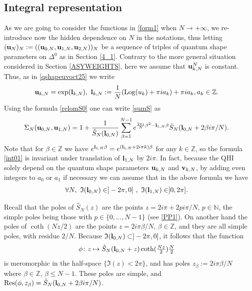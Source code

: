 \documentclass[11pt]{amsart}
\newcommand{\mz}{\mathbb{Z}}
\newcommand{\mn}{\mathbb{N}}
\newcommand{\bu}{{\bf u}}
\newcommand{\bv}{{\bf v}}
\newcommand{\bl}{{\bf l}}
\newcommand{\Log}{{\rm Log}}
\begin{document}
{\subsection{Integral representation} \label{INTREPEST} As we are going to consider the functions in \eqref{form1} when $N\rightarrow +\infty$, we re-introduce now the hidden dependence on $N$ in the notations, thus letting $(\bu_N)_N:=((\bu_{0,N},\bu_{1,N},\bu_{2,N}))_N$ be a sequence of triples of quantum shape parameters on $\Delta^0$ as in Section \ref{4_1}. Contrary to the more general situation considered in Section \ref{ASYWEIGHTS}, here we assume that $\bu_{k,N}^N$ is constant. Thus, as in \eqref{qshapeuvoct25} we write \begin{equation}\label{recapuvarmars25} \bu_{k,N} = \exp(\bl_{k,N}),\ \bl_{k,N}:= \frac{1}{N}(\Log(u_{k}) +\pi ia_{k}) + \pi i a_k, a_{k}\in \mz.\end{equation}
Using the formula \eqref{relomS0} one can write \eqref{sumS} as
\begin{equation}
\Sigma_N(\bu_{0,N},\bu_{1,N}) = 1 + \frac{1}{\hat S_N(\bl_{0,N})}\sum_{\beta=1}^{N-1} e^{\frac{2\pi i}{N} \beta^2 -\bl_{1,N}\beta} \textstyle \hat S_N(\bl_{0,N}+2\beta i\pi/N).\label{int01}
\end{equation}
Note that for $\beta\in \mz$ we have $e^{\bl_{1,N}\beta} = e^{(\bl_{1,N}+2i\pi k)\beta}$ for any $k \in \mz$, so the formula \eqref{int01} is invariant under translation of $\bl_{1,N}$ by $2i\pi$. In fact, because the QHI solely depend on the quantum shape parameters $\bu_{k,N}$ and $\bv_{k,N}$, by adding even integers to $a_0$ or $a_1$ if necessary we can assume that in the above formula we have
\begin{equation}\label{situation2}
\forall N,\ \mathfrak{I}(\bl_{0,N})\in ]-2\pi,0]\ ,\ \mathfrak{I}(\bl_{1,N})\in ]0,2\pi].
\end{equation}

Recall that the poles of $\hat S_N(z)$ are the points $z=2i\pi+2pi\pi/N$, $p\in \mn$, the simple poles being those with $p\in \{0,\ldots,N-1\}$ (see \eqref{PP1}). On another hand the poles of $\coth(Nz/2)$ are the points $z=2i\pi \beta/N$, $\beta\in \mz$, and they are all simple poles, with residue $2/N$. Because $\mathfrak{I}(\bl_{0,N})\subset ]-2\pi,0]$, it follows that the function
$$\textstyle\phi\colon z\mapsto \hat S_N(\bl_{0,N}+z)\coth(\frac{Nz}{2})\frac{N}{2}$$
is meromorphic in the half-space $\{\textstyle \mathfrak{I}(z) < 2\pi\}$, and has poles $\textstyle z_\beta:=2i\pi \beta/N$ where $\beta\in\mz$, $\beta\leq N-1$. These poles are simple, and ${\rm Res}(\phi,z_\beta) =\hat S_N(\bl_{0,N}+2\beta i\pi/N)$. 

}
\end{document}
